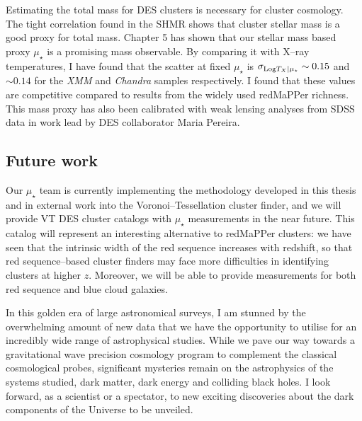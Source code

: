 Estimating the total mass for DES clusters is necessary for cluster cosmology. The tight correlation found in the SHMR shows that cluster stellar mass is a good proxy for total mass. Chapter 5 has shown that our stellar mass based proxy $\mu_\star $ is a promising mass observable. By comparing it with X--ray temperatures, I have found that the scatter at fixed $\mu_\star$ is $\sigma_{{\rm Log}T_X|\mu_\star }\sim 0.15$ and $\sim 0.14$ for the \emph{XMM} and \emph{Chandra} samples respectively. I found that these values are competitive compared to results from the widely used redMaPPer richness. This mass proxy has also been calibrated with weak lensing analyses from SDSS data in work lead by DES collaborator Maria Pereira. 

\subsection{Future work}
Our $\mu_\star$ team is currently implementing the methodology developed in this thesis and in external work into the Voronoi--Tessellation cluster finder, and we will provide VT DES cluster catalogs with $\mu_\star$ measurements in the near future. This catalog will represent an interesting alternative to redMaPPer clusters: we have seen that the intrinsic width of the red sequence increases with redshift, so that red sequence--based cluster finders may face more difficulties in identifying clusters at higher $z$. Moreover, we will be able to provide measurements for both red sequence and blue cloud galaxies.

In this golden era of large astronomical surveys, I am stunned by the overwhelming amount of new data that we have the opportunity to utilise for an incredibly wide range of astrophysical studies. While we pave our way towards a gravitational wave precision cosmology program to complement the classical cosmological probes, significant mysteries remain on the astrophysics of the systems studied, dark matter, dark energy and colliding black holes. I look forward, as a scientist or a spectator, to new exciting discoveries about the dark components of the Universe to be unveiled.




